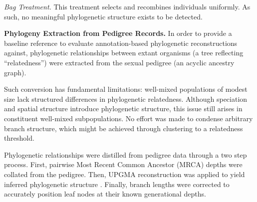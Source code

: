 \textit{Bag Treatment.}
This treatment selects and recombines individuals uniformly.
As such, no meaningful phylogenetic structure exists to be detected.

\textbf{Phylogeny Extraction from Pedigree Records.}
In order to provide a baseline reference to evaluate annotation-based phylogenetic reconstructions against, phylogenetic relationships between extant organisms (a tree reflecting ``relatedness'') were extracted from the sexual pedigree (an acyclic ancestry graph).

Such conversion has fundamental limitations: well-mixed populations of modest size lack structured differences in phylogenetic relatedness.
Although speciation and spatial structure introduce phylogenetic structure, this issue still arises in constituent well-mixed subpopulations.
No effort was made to condense arbitrary branch structure, which might be achieved through clustering to a relatedness threshold.

Phylogenetic relationships were distilled from pedigree data through a two step process.
First, pairwise Most Recent Common Ancestor (MRCA) depths were collated from the pedigree.
Then, UPGMA reconstruction was applied to yield inferred phylogenetic structure \citep{sokal1958university}.
Finally, branch lengths were corrected to accurately position leaf nodes at their known generational depths.

